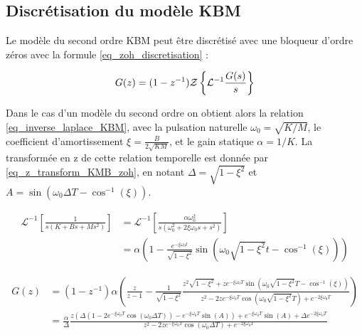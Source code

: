 \begin{appendices}
	
	\tikzexternaldisable
	
	\chapter{Discrétisation du modèle KBM} \label{app_discretisation}
	
	\vspace{5mm}
	
	Le modèle du second ordre KBM peut être discrétisé avec une bloqueur d'ordre zéros avec la formule \cref{eq_zoh_discretisation} :
	
	\begin{equation} \label{eq_zoh_discretisation}
		G(z) = (1 - z^{-1}) \mathcal{Z} \left\{ \mathcal{L}^{-1} \frac{G(s)}{s} \right\}
	\end{equation}
	
	Dans le cas d'un modèle du second ordre on obtient alors la relation \cref{eq_inverse_laplace_KBM}, avec la pulsation naturelle $\omega_0=\sqrt{K/M}$, le coefficient d'amortissement $\xi=\frac{B}{2\sqrt{KM}}$, et le gain statique $\alpha=1/K$. La transformée en z de cette relation temporelle est donnée par \cref{eq_z_transform_KMB_zoh}, en notant $\Delta = \sqrt{1 - \xi^2} $ et $A = \sin\left( \omega_0\Delta T - \cos^{-1}(\xi) \right) $.
	
	\begin{equation} \label{eq_inverse_laplace_KBM}
		\begin{split}
			\mathcal{L}^{-1} \left[ \frac{1}{s\left( K + Bs + Ms^2 \right)} \right] &= \mathcal{L}^{-1} \left[ \frac{\alpha \omega_0^2}{s(\omega_0^2 + 2\xi\omega_0s + s^2)} \right] \\
			&= \alpha \left( 1 - \frac{e^{-\xi\omega_0t}}{\sqrt{1 - \xi^2}} \sin\left(\omega_0\sqrt{1 - \xi^2}t - \cos^{-1}(\xi)\right) \right)
		\end{split}
	\end{equation}
	
	\begin{equation} \label{eq_z_transform_KMB_zoh}
		\begin{split}
			G(z) &= (1 - z^{-1}) \alpha\left( \frac{z}{z-1} - \frac{1}{\sqrt{1 - \xi^2}} \frac{z^2\sqrt{1 - \xi^2} + ze^{-\xi\omega_0T} \sin\left( \omega_0\sqrt{1 - \xi^2}T - \cos^{-1}(\xi) \right)}{z^2 - 2ze^{-\xi\omega_0T} \cos\left( \omega_0\sqrt{1 - \xi^2}T \right) + e^{-2\xi\omega_0T}} \right) \\
			&= \frac{\alpha}{\Delta} \frac{z \left( \Delta \left(1 - 2e^{-\xi\omega_0T} \cos\left( \omega_0\Delta T \right) \right) - e^{-\xi\omega_0T} \sin(A)\right) + e^{-\xi\omega_0T} \sin(A) + \Delta e^{-2\xi\omega_0T}} {z^2 - 2ze^{-\xi\omega_0T} \cos\left( \omega_0\Delta T \right) +e^{-2\xi\omega_0T} }
		\end{split}
	\end{equation}
	

\end{appendices}
